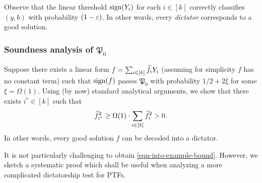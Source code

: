   
Observe that the linear threshold $\textnormal{sign}(Y_i)$ for each $i \in
[k]$ correctly classifies $(y,b)$ with probability $(1-\varepsilon)$. 
In other words, every \emph{dictator} corresponds to a good
solution.


\subsubsection{Soundness analysis of
$\mathfrak{P}_0$}\label{sec-intro-soundness-P0}
Suppose there exists a linear form $f =  
\sum_{i \in [k]}\widehat{f}_iY_i$ (assuming for
simplicity $f$ has no
constant term) such that
$\textnormal{sign}(f)$ passes $\mathfrak{P}_0$
 with probability $1/2 +
2\xi$ for
some $\xi = \Omega(1)$. Using (by now) standard analytical
arguments, we show that there exists $i^* \in [k]$ such that
\begin{equation}
\widehat{f}_{i^*}^2 \geq
\Omega(1)\cdot\sum_{i\in[k]}\widehat{f}_{i}^2 > 0. 
\label{eqn-into-example-bound}
\end{equation}
In other words, every good solution $f$ can be decoded into a 
dictator.

\medskip
It is not particularly challenging to obtain \eqref{eqn-into-example-bound}.
However, we sketch a systematic proof which shall be useful
when analyzing a more complicated dictatorship test for PTFs.  

